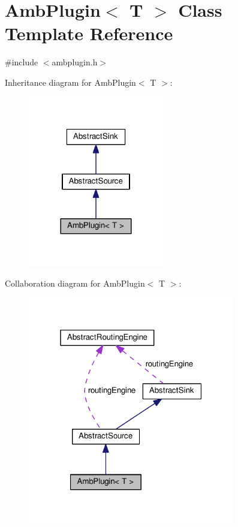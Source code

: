\hypertarget{classAmbPlugin}{\section{Amb\+Plugin$<$ T $>$ Class Template Reference}
\label{classAmbPlugin}
}


{\ttfamily \#include $<$ambplugin.\+h$>$}



Inheritance diagram for Amb\+Plugin$<$ T $>$\+:\nopagebreak
\begin{figure}[H]
\begin{center}
\leavevmode
\includegraphics[width=168pt]{classAmbPlugin__inherit__graph}
\end{center}
\end{figure}


Collaboration diagram for Amb\+Plugin$<$ T $>$\+:\nopagebreak
\begin{figure}[H]
\begin{center}
\leavevmode
\includegraphics[width=256pt]{classAmbPlugin__coll__graph}
\end{center}
\end{figure}
